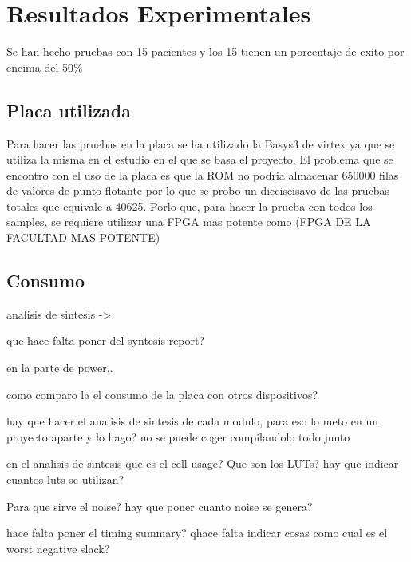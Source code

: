 \chapter{Resultados Experimentales}
	Se han hecho pruebas con 15 pacientes y los 15 tienen un porcentaje de exito por encima del 50\%


\section{Placa utilizada}
Para hacer las pruebas en la placa se ha utilizado la Basys3 de virtex ya que se utiliza la misma en el estudio en el que se basa el proyecto.
El problema que se encontro con el uso de la placa es que la ROM no podria almacenar 650000 filas de valores de punto flotante por lo que se probo un dieciseisavo de las pruebas totales que equivale a 40625.
Porlo que, para hacer la prueba con todos los samples, se requiere utilizar una FPGA mas potente como (FPGA DE LA FACULTAD MAS POTENTE) 
\section{Consumo}
	analisis de sintesis ->
	
	que hace falta poner del syntesis report?

	en la parte de power..

	como comparo la el consumo de la placa con otros dispositivos?

	hay que hacer el analisis de sintesis de cada modulo, para eso lo meto en un proyecto aparte y lo hago? no se puede coger compilandolo todo junto

	en el analisis de sintesis que es el cell usage? Que son los LUTs? hay que indicar cuantos luts se utilizan?

	Para que sirve el noise? hay que poner cuanto noise se genera?

	hace falta poner el timing summary? qhace falta indicar cosas como cual es el worst negative slack?

	